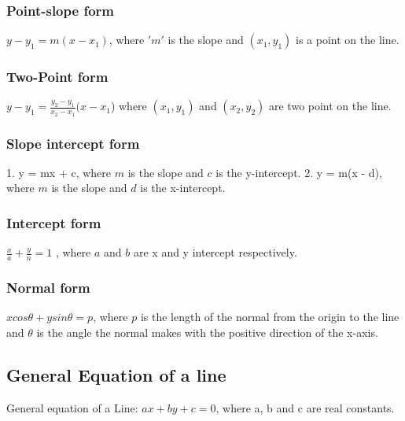 \documentclass[12pt]{article}
\begin{document}
\begin{multicols}{2}
\subsubsection*{Point-slope form }

$y - y_1 = m(x - x_1)$, where $'m'$ is the slope and $(x_1, y_1)$ is a point on the line.

\subsubsection*{Two-Point form}

$y - y_1 = \frac{y_2-y_1}{x_2-x_1 }(x - x_1$) where $(x_1, y_1)$ and $(x_2, y_2)$ are two point on the line.

\subsubsection*{Slope intercept form}

1. y = mx + c, where $m$ is the slope and $c$ is the y-intercept.
2. y = m(x - d), where $m$ is the slope and $d$ is the x-intercept.

\subsubsection*{Intercept form}
$\frac{x}{a}+\frac{y}{n}=1$ , where $a$ and $b$ are x and y intercept respectively.

\subsubsection*{Normal form }
$ x cos \theta + y sin \theta = p$, where $p$ is the length of the normal from the origin to the line and $\theta$ is the angle the normal makes with the positive direction of the x-axis.

\subsection*{General Equation of a line }
General equation of a Line: $ax + by + c = 0$, where a, b and c are real constants.


\end{multicols}
\end{document}
